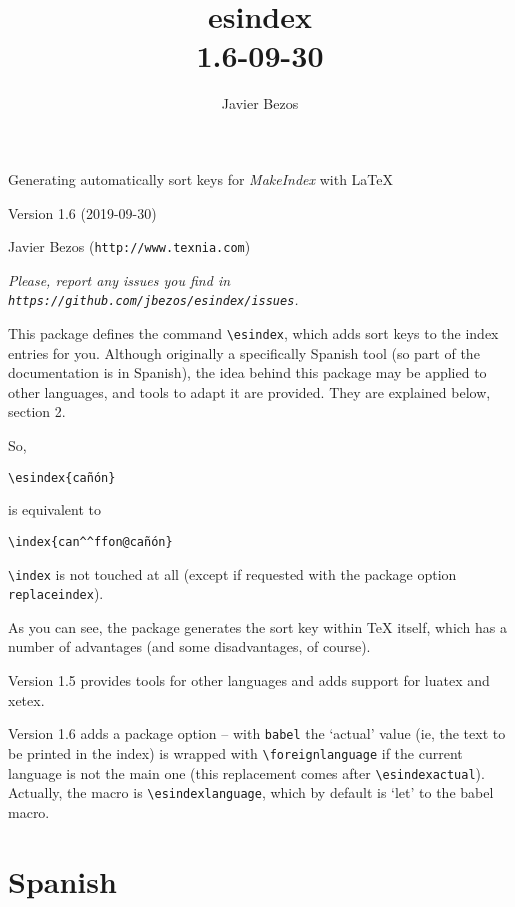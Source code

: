 \documentclass[a4paper]{ltxguide}
\title{\textsf{esindex}\\\large 1.6\quad 2019-09-30}
\author{Javier Bezos}
\begin{document}
\vspace*{1cm}
{\fontsize{48}{48}\selectfont \color{notes}{esindex}\par}
{\LARGE Generating automatically sort keys for \textit{MakeIndex}
with \LaTeX\par}
\vspace*{1ex}
Version 1.6 (2019-09-30)\par
Javier Bezos (\texttt{http://www.texnia.com})

\vspace*{6ex}

{\small\itshape Please, report any issues you find in
  \texttt{https://github.com/jbezos/esindex/issues}.\par}

This package defines the command \verb|\esindex|, which adds sort keys
to the index entries for you. Although originally a specifically Spanish
tool (so part of the documentation is in Spanish), the idea behind this
package may be applied to other languages, and tools to adapt it are
provided. They are explained below, section 2.

So,
\begin{verbatim}
\esindex{cañón}
\end{verbatim}
is equivalent to
\begin{verbatim}
\index{can^^ffon@cañón}
\end{verbatim}

\verb|\index| is not touched at all (except if requested with the package
option \verb|replaceindex|).

As you can see, the package generates the sort key within \TeX{}
itself, which has a number of advantages (and some disadvantages, of
course).

Version 1.5 provides tools for other languages and adds support for
\textsf{luatex} and \textsf{xetex}.

Version 1.6 adds a package option -- with \verb|babel| the `actual' value
(ie, the text to be printed in the index) is wrapped with
\verb|\foreignlanguage| if the current language is not the main one
(this replacement comes after \verb|\esindexactual|). Actually, the
macro is \verb|\esindexlanguage|, which by default is `let' to the
\textsf{babel} macro.

\section{Spanish}
\end{document}
